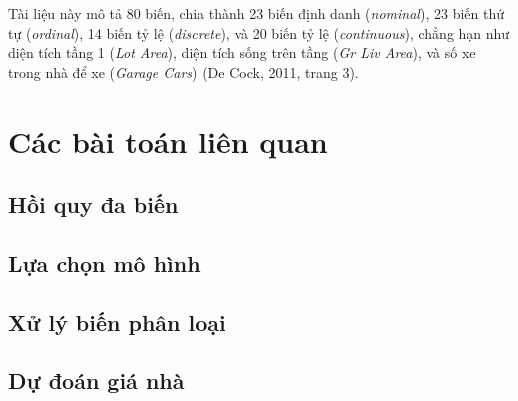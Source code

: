 \documentclass{article}
\begin{document}
Tài liệu này mô tả 80 biến, chia thành 23 biến định danh (\textit{nominal}), 23 biến thứ tự (\textit{ordinal}), 14 biến tỷ lệ (\textit{discrete}), và 20 biến tỷ lệ (\textit{continuous}), chẳng hạn như diện tích tầng 1 (\textit{Lot Area}), diện tích sống trên tầng (\textit{Gr Liv Area}), và số xe trong nhà để xe (\textit{Garage Cars}) (De Cock, 2011, trang 3).

\section{Các bài toán liên quan}

\subsection{Hồi quy đa biến}

\subsection{Lựa chọn mô hình}

\subsection{Xử lý biến phân loại}

\subsection{Dự đoán giá nhà}

\end{document}
